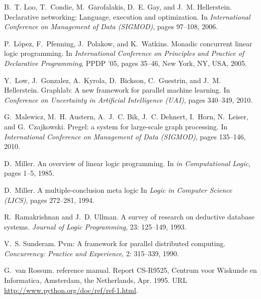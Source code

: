 \documentclass{sigplanconf}
\begin{document}
\begin{thebibliography}{35}
B.~T. Loo, T.~Condie, M.~Garofalakis, D.~E. Gay, and J.~M. Hellerstein.
\newblock Declarative networking: Language, execution and optimization.
\newblock In \emph{International Conference on Management of Data (SIGMOD)},
  pages 97--108, 2006.

P.~L\'{o}pez, F.~Pfenning, J.~Polakow, and K.~Watkins.
\newblock Monadic concurrent linear logic programming.
\newblock In \emph{International Conference on Principles and Practice of Declarative Programming}, PPDP '05, pages
  35--46, New York, NY, USA, 2005.

Y.~Low, J.~Gonzalez, A.~Kyrola, D.~Bickson, C.~Guestrin, and J.~M. Hellerstein.
\newblock Graphlab: {A} new framework for parallel machine learning.
\newblock In \emph{Conference on Uncertainty in Artificial Intelligence (UAI)},
  pages 340--349, 2010.

G.~Malewicz, M.~H. Austern, A.~J.~C. Bik, J.~C. Dehnert, I.~Horn, N.~Leiser,
  and G.~Czajkowski.
\newblock Pregel: a system for large-scale graph processing.
\newblock In \emph{International Conference on Management of Data (SIGMOD)},
  pages 135--146, 2010.

D.~Miller.
\newblock An overview of linear logic programming.
\newblock In \emph{in Computational Logic}, pages 1--5, 1985.

D.~Miller.
\newblock A multiple-conclusion meta logic
\newblock In \emph{Logic in Computer Science (LICS)}, pages 272--281, 1994.

R.~Ramakrishnan and J.~D. Ullman.
\newblock A survey of research on deductive database systems.
\newblock \emph{Journal of Logic Programming}, 23: 125--149, 1993.

V.~S. Sunderam.
\newblock Pvm: A framework for parallel distributed computing.
\newblock \emph{Concurrency: Practice and Experience}, 2: 315--339,
  1990.

G.~{van Rossum}.
 reference manual.
\newblock Report CS-R9525, Centrum voor Wiskunde en Informatica, Amsterdam, the
  Netherlands, Apr. 1995.
\newblock URL \url{http://www.python.org/doc/ref/ref-1.html}.


\end{thebibliography}
\end{document}
